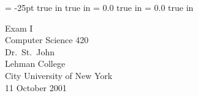 \pagestyle{empty}
\topmargin= -25pt
 true in
 true in
\oddsidemargin = 0.0 true in
\evensidemargin = 0.0 true in
\newcommand{\ul}{\underline}
\newcommand{\spa}{\hspace{.25in}}


{\large
\begin{center}
    Exam I\\
    Computer Science 420 \\
    Dr.~St.~John\\ 
    Lehman College\\
    City University of New York\\ 
    11 October 2001
\end{center}
}

